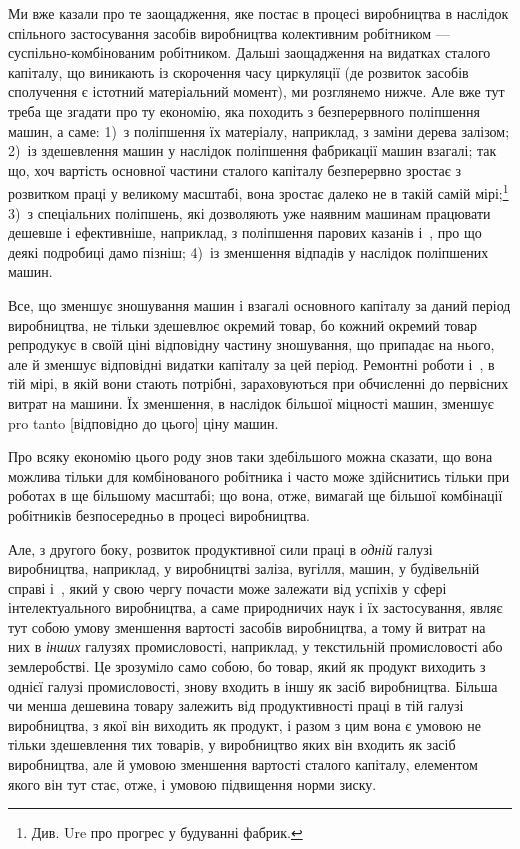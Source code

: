 Ми вже казали про те заощадження, яке постає в процесі
виробництва в наслідок спільного застосування засобів виробництва
колективним робітником — суспільно-комбінованим робітником.
Дальші заощадження на видатках сталого капіталу, що
виникають із скорочення часу циркуляції (де розвиток засобів
сполучення є істотний матеріальний момент), ми розглянемо
нижче. Але вже тут треба ще згадати про ту економію, яка
походить з безперервного поліпшення машин, а саме: 1)~з поліпшення
їх матеріалу, наприклад, з заміни дерева залізом; 2)~із
здешевлення машин у наслідок поліпшення фабрикації машин
взагалі; так що, хоч вартість основної частини сталого капіталу
безперервно зростає з розвитком праці у великому масштабі,
вона зростає далеко не в такій самій мірі;\footnote{
Див. Ure про прогрес у будуванні фабрик.
} 3)~з спеціальних поліпшень,
які дозволяють уже наявним машинам працювати дешевше
і ефективніше, наприклад, з поліпшення парових казанів
і~, про що деякі подробиці дамо пізніш; 4)~із зменшення
відпадів у наслідок поліпшених машин.

Все, що зменшує зношування машин і взагалі основного капіталу
за даний період виробництва, не тільки здешевлює окремий
товар, бо кожний окремий товар репродукує в своїй ціні
відповідну частину зношування, що припадає на нього, але
й зменшує відповідні видатки капіталу за цей період. Ремонтні
роботи і~, в тій мірі, в якій вони стають потрібні, зараховуються
при обчисленні до первісних витрат на машини. Їх зменшення,
в наслідок більшої міцності машин, зменшує pro tanto
[відповідно до цього] ціну машин.

Про всяку економію цього роду знов таки здебільшого можна
сказати, що вона можлива тільки для комбінованого робітника
і часто може здійснитись тільки при роботах в ще більшому
масштабі; що вона, отже, вимагай ще більшої комбінації робітників
безпосередньо в процесі виробництва.

Але, з другого боку, розвиток продуктивної сили праці
в \emph{одній} галузі виробництва, наприклад, у виробництві заліза,
вугілля, машин, у будівельній справі і~, який у свою чергу
почасти може залежати від успіхів у сфері інтелектуального
виробництва, а саме природничих наук і їх застосування, являє
тут собою умову зменшення вартості засобів виробництва, а тому
й витрат на них в \emph{інших} галузях промисловості, наприклад,
у текстильній промисловості або землеробстві. Це зрозуміло
само собою, бо товар, який як продукт виходить з однієї галузі
промисловості, знову входить в іншу як засіб виробництва.
Більша чи менша дешевина товару залежить від продуктивності
праці в тій галузі виробництва, з якої він виходить як продукт,
і разом з цим вона є умовою не тільки здешевлення тих товарів,
у виробництво яких він входить як засіб виробництва, але
й умовою зменшення вартості сталого капіталу, елементом якого
він тут стає, отже, і умовою підвищення норми зиску.

